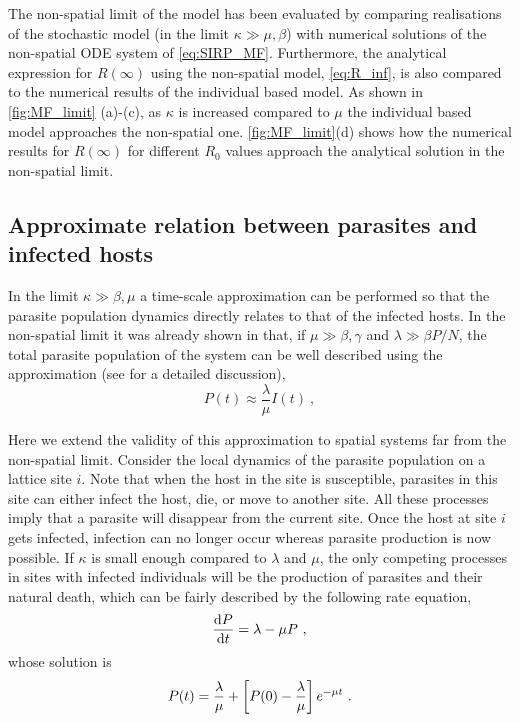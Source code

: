 The non-spatial limit of the model has been evaluated by comparing realisations
of the stochastic model (in the limit $\kappa\gg\mu,\beta$) with numerical
solutions of the non-spatial ODE system of \cref{eq:SIRP_MF}. Furthermore, the
analytical expression for $R(\infty)$ using the non-spatial model,
\cref{eq:R_inf}, is also compared to the numerical results of the individual
based model. As shown in \cref{fig:MF_limit} (a)-(c), as $\kappa$ is increased
compared to $\mu$ the individual based model approaches the non-spatial one.
\cref{fig:MF_limit}(d) shows how the numerical results for $R(\infty)$ for
different $R_0$ values approach the analytical solution in the non-spatial
limit.

\subsection{Approximate relation between parasites and infected hosts}

In the limit $\kappa\gg\beta,\mu$ a time-scale approximation can be
performed so that the parasite population dynamics directly relates to that of
the infected hosts. In the non-spatial limit it was already shown in
\cite{GimenezRomero2021} that, if  $\mu\gg\beta,\gamma$ and $\lambda\gg\beta
    P/N$, the total parasite population of the system can be well described
using
the approximation (see \cite{GimenezRomero2021} for a detailed discussion),
\begin{equation}\label{eq:P_approx_II_II}
    P(t)\approx \frac{\lambda}{\mu} I(t) \ ,
\end{equation}

Here we extend the validity of this approximation to spatial systems far
from the non-spatial limit. Consider the local dynamics of the parasite
population on a lattice site $i$. Note that when the host in the site is
susceptible, parasites in this site can either infect the host, die, or move to
another site. All these processes imply that a parasite will disappear from the
current site. Once the host at site $i$ gets infected, infection can no longer
occur whereas parasite production is now possible. If $\kappa$ is small enough
compared to $\lambda$ and $\mu$,  the only competing processes in sites with
infected individuals will be the production of parasites and their natural
death, which can be fairly described by the following rate equation,
\begin{equation}
    \frac{\mathrm{d} P}{\mathrm{d} t}=\lambda-\mu P \ ,
\end{equation}
whose solution is
\begin{equation}\label{eq:P_evol}
    P(t)=\frac{\lambda}{\mu}+\left[P(0)-\frac{\lambda}{\mu}\right]e^{-\mu t}
    \ .
\end{equation}


